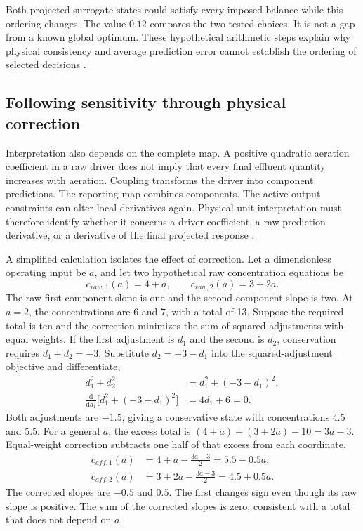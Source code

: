 Both projected surrogate states could satisfy every imposed balance while this ordering changes. The value $0.12$ compares the two tested choices. It is not a gap from a known global optimum. These hypothetical arithmetic steps explain why physical consistency and average prediction error cannot establish the ordering of selected decisions \citep{Alexandrov1998,Pedrozo2025}.

\subsection{Following sensitivity through physical correction}

Interpretation also depends on the complete map. A positive quadratic aeration coefficient in a raw driver does not imply that every final effluent quantity increases with aeration. Coupling transforms the driver into component predictions. The reporting map combines components. The active output constraints can alter local derivatives again. Physical-unit interpretation must therefore identify whether it concerns a driver coefficient, a raw prediction derivative, or a derivative of the final projected response \citep{Brunton2016,Shen2023}.

A simplified calculation isolates the effect of correction. Let a dimensionless operating input be $a$, and let two hypothetical raw concentration equations be
\[
c_{raw,1}(a)=4+a,\qquad c_{raw,2}(a)=3+2a.
\]
The raw first-component slope is one and the second-component slope is two. At $a=2$, the concentrations are 6 and 7, with a total of 13. Suppose the required total is ten and the correction minimizes the sum of squared adjustments with equal weights. If the first adjustment is $d_1$ and the second is $d_2$, conservation requires $d_1+d_2=-3$. Substitute $d_2=-3-d_1$ into the squared-adjustment objective and differentiate,
\[
\begin{aligned}
d_1^2+d_2^2&=d_1^2+(-3-d_1)^2,\\
\frac{\mathrm d}{\mathrm d d_1}\bigl[d_1^2+(-3-d_1)^2\bigr]
&=4d_1+6=0.
\end{aligned}
\]
Both adjustments are $-1.5$, giving a conservative state with concentrations 4.5 and 5.5. For a general $a$, the excess total is $(4+a)+(3+2a)-10=3a-3$. Equal-weight correction subtracts one half of that excess from each coordinate,
\[
\begin{aligned}
c_{aff,1}(a)&=4+a-\frac{3a-3}{2}=5.5-0.5a,\\
c_{aff,2}(a)&=3+2a-\frac{3a-3}{2}=4.5+0.5a.
\end{aligned}
\]
The corrected slopes are $-0.5$ and $0.5$. The first changes sign even though its raw slope is positive. The sum of the corrected slopes is zero, consistent with a total that does not depend on $a$.

